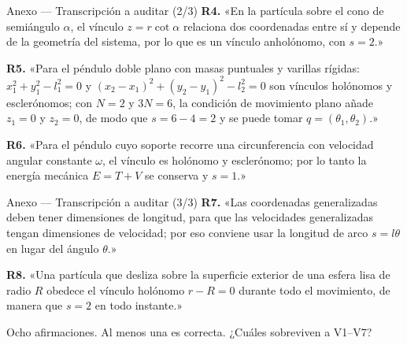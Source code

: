 \documentclass[10pt,aspectratio=169]{beamer}
\begin{document}
\begin{frame}{Anexo --- Transcripción a auditar (2/3)}
  \small
  \textbf{R4.} «En la partícula sobre el cono de semiángulo $\alpha$, el vínculo $z=r\cot\alpha$ relaciona dos coordenadas entre sí y depende de la geometría del sistema, por lo que es un vínculo anholónomo, con $s=2$.»
  \vspace{0.5em}

  \textbf{R5.} «Para el péndulo doble plano con masas puntuales y varillas rígidas: $x_1^2+y_1^2-l_1^2=0$ y $(x_2-x_1)^2+(y_2-y_1)^2-l_2^2=0$ son vínculos holónomos y esclerónomos; con $N=2$ y $3N=6$, la condición de movimiento plano añade $z_1=0$ y $z_2=0$, de modo que $s=6-4=2$ y se puede tomar $q=(\theta_1,\theta_2)$.»
  \vspace{0.5em}

  \textbf{R6.} «Para el péndulo cuyo soporte recorre una circunferencia con velocidad angular constante $\omega$, el vínculo es holónomo y esclerónomo; por lo tanto la energía mecánica $E=T+V$ se conserva y $s=1$.»
\end{frame}

\begin{frame}{Anexo --- Transcripción a auditar (3/3)}
  \small
  \textbf{R7.} «Las coordenadas generalizadas deben tener dimensiones de longitud, para que las velocidades generalizadas tengan dimensiones de velocidad; por eso conviene usar la longitud de arco $s=l\theta$ en lugar del ángulo $\theta$.»
  \vspace{0.6em}

  \textbf{R8.} «Una partícula que desliza sobre la superficie exterior de una esfera lisa de radio $R$ obedece el vínculo holónomo $r-R=0$ durante todo el movimiento, de manera que $s=2$ en todo instante.»
  \vspace{1.2em}
  \pause
  \begin{center}
    \alert{Ocho afirmaciones. Al menos una es correcta. ¿Cuáles sobreviven a V1--V7?}
  \end{center}
\end{frame}
\end{document}
